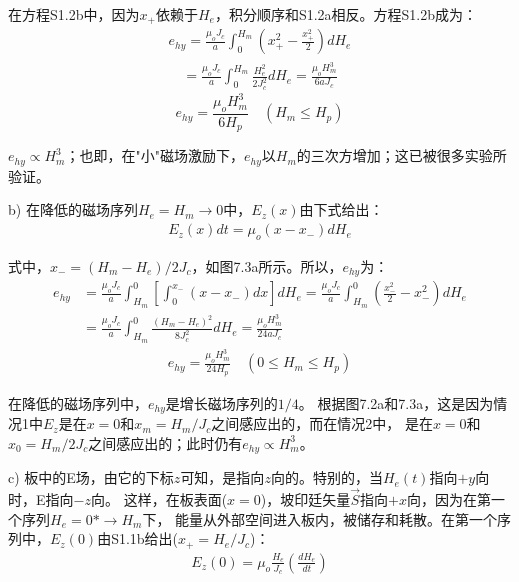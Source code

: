 在方程S1.2b中，因为$x_+$依赖于$H_e$，积分顺序和S1.2a相反。方程S1.2b成为：
\begin{align*}%
e_{hy}=\frac{\mu_oJ_c}{a}\int_{0}^{H_m}\left(x_{+}^{2}-\frac{x_{+}^{2}}{2}\right)dH_e  \tag{S1.2c}
\end{align*}
\begin{align*}
=\frac{\mu_oJ_c}{a}\int_{0}^{H_m}\frac{H_{e}^{2}}{2J_{c}^{2}}dH_e=\frac{\mu_oH_{m}^{3}}{6aJ_c} \tag{S1.2d}
\end{align*}
\begin{equation}%
e_{hy}=\frac{\mu_oH_{m}^{3}}{6H_p} \quad   (H_m\leq H_p) \tag{7.13a}
\end{equation}

$e_{hy}\propto H_m^3$；也即，在"小"磁场激励下，$e_{hy}$以$H_m$的三次方增加；这已被很多实验所验证。

b) 在降低的磁场序列$H_e=H_m\rightarrow 0$中，$E_z(x)$由下式给出：
\begin{align*}%
E_z(x)dt=\mu_o(x-x_-)dH_e \tag{S1.3}
\end{align*}

式中，$x_-=(H_m-H_e)/2J_c$，如图7.3a所示。所以，$e_{hy}$为：
\begin{align*}%
e_{hy}&=\frac{\mu_oJ_c}{a}\int_{H_m}^{0}\left[\int_{0}^{x_-}(x-x_-)dx\right]dH_e=\frac{\mu_oJ_c}{a}\int_{H_m}^{0}\left(\frac{x_{-}^{2}}{2}-x_{-}^{2}\right)dH_e \\\tag{S1.4}
&=\frac{\mu_oJ_c}{a}\int_{H_m}^{0}\frac{(H_m-H_e)^2}{8J_{c}^{2}}dH_e=\frac{\mu_oH_{m}^{3}}{24aJ_c}
\end{align*}
\begin{align*}%
e_{hy}=\frac{\mu_oH_{m}^{3}}{24H_p}  \quad     (0\leq H_m\leq H_p) \tag{7.14a}
\end{align*}

在降低的磁场序列中，$e_{hy}$是增长磁场序列的$1/4$。
根据图7.2a和7.3a，这是因为情况1中$E_z$是在$x=0$和$x_m=H_m/J_c$之间感应出的，而在情况2中，
是在$x=0$和$x_0=H_m/2J_c$之间感应出的；此时仍有$e_{hy}\propto H_m^3$。

c) 板中的E场，由它的下标$z$可知，是指向$z$向的。特别的，当$H_e(t)$指向$+y$向时，E指向$-z$向。
这样，在板表面($x=0$)，坡印廷矢量$\vec{S}$指向$+x$向，因为在第一个序列$H_e=0*\rightarrow H_m$下，
能量从外部空间进入板内，被储存和耗散。在第一个序列中，$E_z(0)$由S1.1b给出($x_+=H_e/J_c$)：
\begin{align*}%
E_z(0)=\mu_o\frac{H_e}{J_c}\left(\frac{dH_e}{dt}\right) \tag{S1.5a}
\end{align*}

